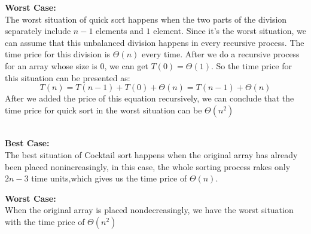 \documentclass[12pt,a4paper]{article}
\theoremstyle{definition}
\begin{document}
\begin{enumerate}
\begin{enumerate}
\textbf{Worst Case:}\\
The worst situation of quick sort happens when the two parts of the division separately include $n-1$ elements and $1$ element. Since it's the worst situation, we can assume that this unbalanced division happens in every recursive process. The time price for this division is $\Theta\left(n\right)$ every time. After we do a recursive process for an array whose size is 0, we can get $T\left(0\right)=\Theta\left(1\right)$. So the time price for this situation can be presented as:
\begin{equation}
    T\left(n\right) = T\left(n-1\right) + T\left(0\right) + \Theta\left(n\right) = T\left(n-1\right) + \Theta\left(n\right)
\end{equation}
After we added the price of this equation recursively, we can conclude that the time price for quick sort in the worst situation can be $\Theta\left(n^2\right)$


\vspace{1mm}\\

\textbf{Best Case:}\\
The best situation of Cocktail sort happens when the original array has already been placed nonincreasingly, in this case, the whole sorting process rakes only $2n-3$ time units,which gives us the time price of $\Theta\left(n\right)$. 

\textbf{Worst Case:}\\
When the original array is placed nondecreasingly, we have the worst situation with the time price of $\Theta\left(n^2\right)$



\end{enumerate}
\end{enumerate}
\end{document}
